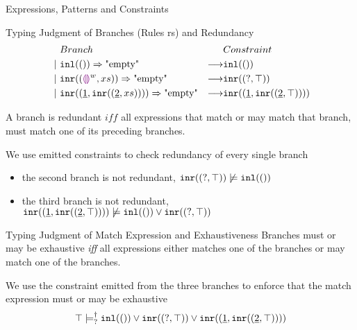 \documentclass[notheorems]{beamer}
\theoremstyle{slplain}
\numberwithin{thm}{section}
\newlength{\onecolwid}
\begin{document}
\begin{frame}[containsverbatim]
\begin{columns}[t]
\begin{column}{\onecolwid}
\begin{block}{Expressions, Patterns and Constraints}
\end{block}

\begin{block}{Typing Judgment of Branches (Rules rs) and Redundancy}
  \begin{align*}
    & Branch & & Constraint \\
    ~\vert~ &
    \mathtt{inl}(()) \Rightarrow \text{"empty"} & \longrightarrow & \mathtt{inl}(()) \\
    ~\vert~ &
    \mathtt{inr}((\textcolor{violet}{\llparenthesis}\textcolor{violet}{\rrparenthesis}^{w} , xs)) \Rightarrow \text{"empty"} & \longrightarrow & \mathtt{inr}((\mathtt{?} , \top)) \\
    ~\vert~ &
    \mathtt{inr}((\underline{1} , \mathtt{inr}((\underline{2} , xs)))) \Rightarrow \text{"empty"} & \longrightarrow & \mathtt{inr}((\underline{1} , \mathtt{inr}((\underline{2} , \top))))
  \end{align*}

  A branch is redundant $\textit{iff}$ all expressions that match or may match that branch, must match one of its preceding branches.
  
  We use emitted constraints to check redundancy of every single branch
  \begin{itemize}
    \item the second branch is not redundant, $\mathtt{inr}((\mathtt{?} , \top)) \not\models \mathtt{inl}(())$
  \item the third branch is not redundant, $\mathtt{inr}((\underline{1} , \mathtt{inr}((\underline{2} , \top)))) \not\models \mathtt{inl}(()) \vee \mathtt{inr}((\mathtt{?} , \top))$
  \end{itemize}
\end{block}

\begin{block}{Typing Judgment of Match Expression and Exhaustiveness}
  Branches must or may be exhaustive \textit{iff} all expressions either matches one of the branches or may match one of the branches.

  We use the constraint emitted from the three branches to enforce that the match expression must or may be exhaustive
\[
  \csatisfyormay{\ctruth}{
    \cor{\hinlp{\cunit}}{\cor{\hinrp{\cpair{\cunknown}{\ctruth}}}{\cinr{\cpair{\cnum{1}}{\cinr{\cpair{\cnum{2}}{\ctruth}}}}}}
  }
\]
\end{block}


\end{column}
\end{columns}
\end{frame}
\end{document}
